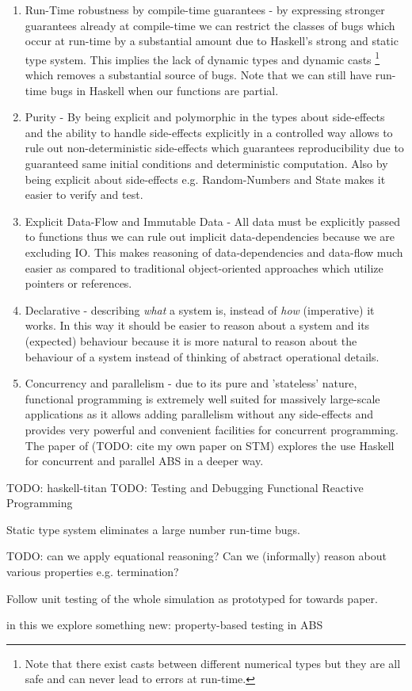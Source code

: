 \begin{enumerate}
	\item Run-Time robustness by compile-time guarantees - by expressing stronger guarantees already at compile-time we can restrict the classes of bugs which occur at run-time by a substantial amount due to Haskell's strong and static type system.  This implies the lack of dynamic types and dynamic casts \footnote{Note that there exist casts between different numerical types but they are all safe and can never lead to errors at run-time.} which removes a substantial source of bugs.  Note that we can still have run-time bugs in Haskell when our functions are partial.
	\item Purity - By being explicit and polymorphic in the types about side-effects and the ability to handle side-effects explicitly in a controlled way allows to rule out non-deterministic side-effects which guarantees reproducibility due to guaranteed same initial conditions and deterministic computation. Also by being explicit about side-effects e.g. Random-Numbers and State makes it easier to verify and test.
	\item Explicit Data-Flow and Immutable Data - All data must be explicitly passed to functions thus we can rule out implicit data-dependencies because we are excluding IO. This makes reasoning of data-dependencies and data-flow much easier as compared to traditional object-oriented approaches which utilize pointers or references.
	\item Declarative - describing \textit{what} a system is, instead of \textit{how} (imperative) it works. In this way it should be easier to reason about a system and its (expected) behaviour because it is more natural to reason about the behaviour of a system instead of thinking of abstract operational details.
	\item Concurrency and parallelism - due to its pure and 'stateless' nature, functional programming is extremely well suited for massively large-scale applications as it allows adding parallelism without any side-effects and provides very powerful and convenient facilities for concurrent programming. The paper of (TODO: cite my own paper on STM) explores the use Haskell for concurrent and parallel ABS in a deeper way.
\end{enumerate}

TODO: haskell-titan
TODO: Testing and Debugging Functional Reactive Programming \cite{perez_testing_2017}

Static type system eliminates a large number run-time bugs.

TODO: can we apply equational reasoning? Can we (informally) reason about various properties e.g. termination?

Follow unit testing of the whole simulation as prototyped for towards paper.

in this we explore something new: property-based testing in ABS